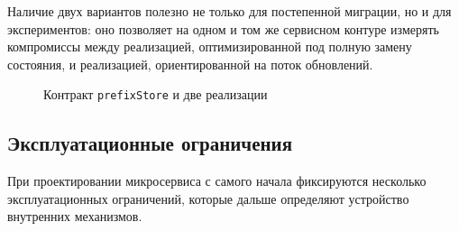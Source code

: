 Наличие двух вариантов полезно не только для постепенной миграции, но и
для экспериментов: оно позволяет на одном и том же сервисном контуре
измерять компромиссы между реализацией, оптимизированной под полную
замену состояния, и реализацией, ориентированной на поток обновлений.

\begin{figure}[ht]
\centering
{}
\caption{Контракт \texttt{prefixStore} и две реализации}
\label{fig:store-contract}
\end{figure}

\subsection{Эксплуатационные ограничения}

При проектировании микросервиса с самого начала фиксируются
несколько эксплуатационных ограничений, которые дальше определяют
устройство внутренних механизмов.

